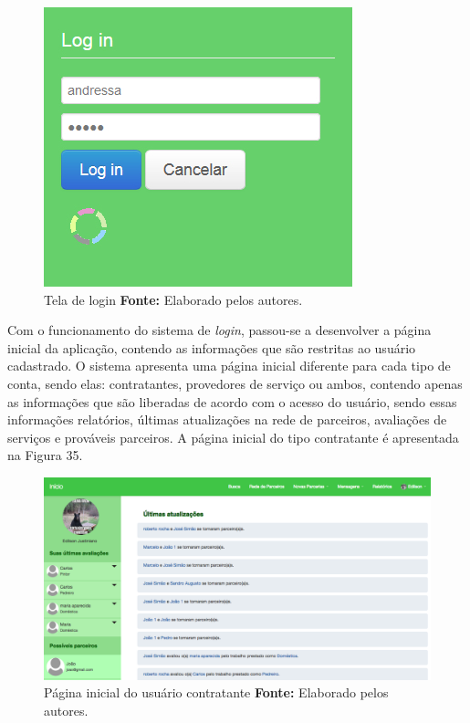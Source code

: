 \begin{figure}[h!]
	\centerline{\includegraphics[scale=0.60]{./imagens/login.jpg}}
	\caption[Tela de login ]
	{Tela de login \textbf{Fonte:} Elaborado pelos autores.}
	\label{fig:exemplo1}
\end{figure}

\par Com o funcionamento do sistema de \textit{login}, passou-se a desenvolver a página inicial da aplicação, contendo as informações que são restritas ao usuário cadastrado. O sistema apresenta uma página inicial diferente para cada tipo de conta, sendo elas: contratantes, provedores de serviço ou ambos, contendo apenas as informações que são liberadas de acordo com o acesso do usuário, sendo essas informações relatórios, últimas atualizações na rede de parceiros, avaliações de serviços e prováveis parceiros. A página inicial do tipo contratante é apresentada na Figura 35.

\begin{figure}[h!]
	\centerline{\includegraphics[scale=0.35]{./imagens/home-contratante.png}}
	\caption[Página inicial do usuário contratante]
	{Página inicial do usuário contratante \textbf{Fonte:} Elaborado pelos autores.}
	\label{fig:exemplo1}
\end{figure}



